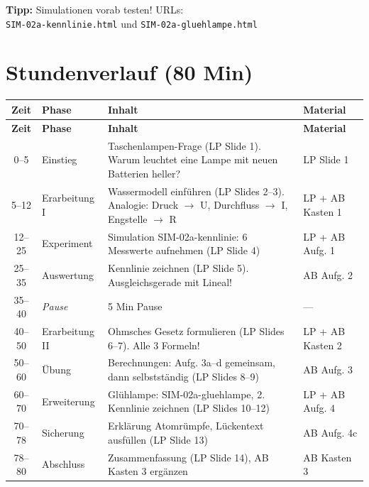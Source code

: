 \documentclass[11pt, a4paper]{article}
\begin{document}
\begin{tipbox}
\textbf{Tipp:} Simulationen vorab testen! URLs:\\
\texttt{SIM-02a-kennlinie.html} und \texttt{SIM-02a-gluehlampe.html}
\end{tipbox}


\section*{Stundenverlauf (80 Min)}

\renewcommand{\arraystretch}{1.3}
\begin{longtable}{|c|p{3cm}|p{7cm}|p{3cm}|}
\hline
\textbf{Zeit} & \textbf{Phase} & \textbf{Inhalt} & \textbf{Material} \\
\hline
\endfirsthead
\hline
\textbf{Zeit} & \textbf{Phase} & \textbf{Inhalt} & \textbf{Material} \\
\hline
\endhead
0--5 & Einstieg & Taschenlampen-Frage (LP Slide 1). Warum leuchtet eine Lampe mit neuen Batterien heller? & LP Slide 1 \\
\hline
5--12 & Erarbeitung I & Wassermodell einführen (LP Slides 2--3). Analogie: Druck $\rightarrow$ U, Durchfluss $\rightarrow$ I, Engstelle $\rightarrow$ R & LP + AB Kasten 1 \\
\hline
12--25 & Experiment & Simulation SIM-02a-kennlinie: 6 Messwerte aufnehmen (LP Slide 4) & LP + AB Aufg. 1 \\
\hline
25--35 & Auswertung & Kennlinie zeichnen (LP Slide 5). Ausgleichsgerade mit Lineal! & AB Aufg. 2 \\
\hline
35--40 & \textit{Pause} & 5 Min Pause & --- \\
\hline
40--50 & Erarbeitung II & Ohmsches Gesetz formulieren (LP Slides 6--7). Alle 3 Formeln! & LP + AB Kasten 2 \\
\hline
50--60 & Übung & Berechnungen: Aufg. 3a--d gemeinsam, dann selbstständig (LP Slides 8--9) & AB Aufg. 3 \\
\hline
60--70 & Erweiterung & Glühlampe: SIM-02a-gluehlampe, 2. Kennlinie zeichnen (LP Slides 10--12) & LP + AB Aufg. 4 \\
\hline
70--78 & Sicherung & Erklärung Atomrümpfe, Lückentext ausfüllen (LP Slide 13) & AB Aufg. 4c \\
\hline
78--80 & Abschluss & Zusammenfassung (LP Slide 14), AB Kasten 3 ergänzen & AB Kasten 3 \\
\hline
\end{longtable}
\end{document}
